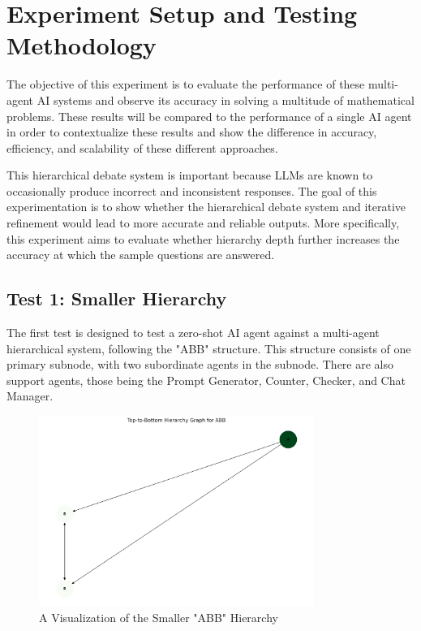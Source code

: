 \section{Experiment Setup and Testing Methodology}
\label{sec:methodology}

The objective of this experiment is to evaluate the performance of these multi-agent AI systems and observe its accuracy in solving a multitude of mathematical problems. These results will be compared to the performance of a single AI agent in order to contextualize these results and show the difference in accuracy, efficiency, and scalability of these different approaches.

This hierarchical debate system is important because LLMs are known to occasionally produce incorrect and inconsistent responses. The goal of this experimentation is to show whether the hierarchical debate system and iterative refinement would lead to more accurate and reliable outputs. More specifically, this experiment aims to evaluate whether hierarchy depth further increases the accuracy at which the sample questions are answered.

\subsection{Test 1: Smaller Hierarchy}
The first test is designed to test a zero-shot AI agent against a multi-agent hierarchical system, following the "ABB" structure. This structure consists of one primary subnode, with two subordinate agents in the subnode. There are also support agents, those being the Prompt Generator, Counter, Checker, and Chat Manager.

\begin{figure}[h]
    \centering
    \includegraphics[width=0.8\textwidth]{img/section_methodology/ABB.png}
    \caption{A Visualization of the Smaller "ABB" Hierarchy}
    \label{fig:smaller}
\end{figure}

